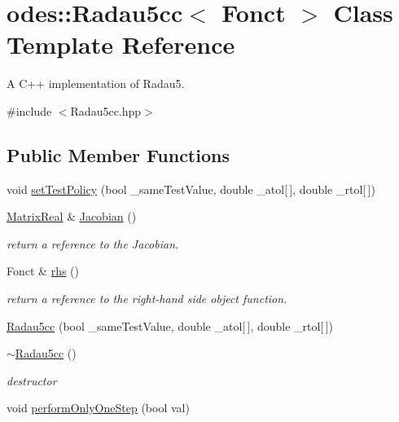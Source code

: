 \hypertarget{classodes_1_1Radau5cc}{\section{odes\-:\-:Radau5cc$<$ Fonct $>$ Class Template Reference}
\label{classodes_1_1Radau5cc}
}


A C++ implementation of Radau5.  




{\ttfamily \#include $<$Radau5cc.\-hpp$>$}

\subsection*{Public Member Functions}
\begin{DoxyCompactItemize}
\item 
void \hyperlink{classodes_1_1Radau5cc_a94bc8707bc5faac1fb8516d044f9f061}{set\-Test\-Policy} (bool \-\_\-same\-Test\-Value, double \-\_\-atol\mbox{[}$\,$\mbox{]}, double \-\_\-rtol\mbox{[}$\,$\mbox{]})
\item 
\hyperlink{classodes_1_1Radau5cc_a8ef067b8852403d48d8528f601a4626a}{Matrix\-Real} \& \hyperlink{classodes_1_1Radau5cc_a68e870fccb45ca4568665a34d0bb1aa8}{Jacobian} ()
\begin{DoxyCompactList}\small\item\em return a reference to the Jacobian. \end{DoxyCompactList}\item 
Fonct \& \hyperlink{classodes_1_1Radau5cc_a761efc49340f89b5148350ce5e76fb64}{rhs} ()
\begin{DoxyCompactList}\small\item\em return a reference to the right-\/hand side object function. \end{DoxyCompactList}\item 
\hyperlink{classodes_1_1Radau5cc_a87750274a7c162114b18a45cd8da0b52}{Radau5cc} (bool \-\_\-same\-Test\-Value, double \-\_\-atol\mbox{[}$\,$\mbox{]}, double \-\_\-rtol\mbox{[}$\,$\mbox{]})
\item 
\hyperlink{classodes_1_1Radau5cc_adcb8d2836087285468b23e675645592c}{$\sim$\-Radau5cc} ()
\begin{DoxyCompactList}\small\item\em destructor \end{DoxyCompactList}\item 
void \hyperlink{classodes_1_1Radau5cc_a982fb7b6b00c6fd760c49fd36d9a4750}{perform\-Only\-One\-Step} (bool val)

\end{DoxyCompactItemize}
